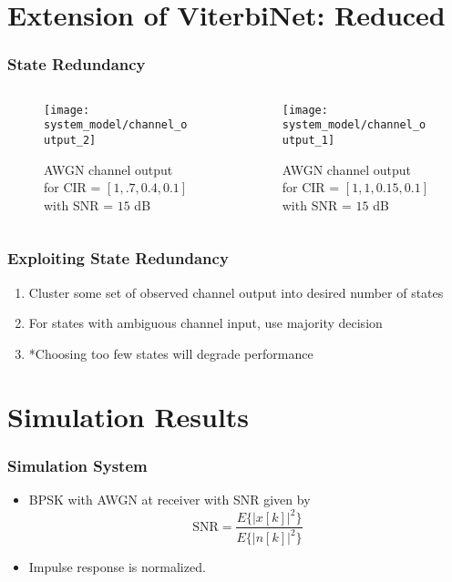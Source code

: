 \documentclass[10pt,tgadventor, onlymath]{beamer}
\begin{document}
\section{Extension of ViterbiNet: Reduced}
\begin{frame}
	\frametitle{State Redundancy}
\begin{columns}
\begin{column}{0.5\linewidth}
\centering
\begin{figure}
	\texttt{[image: system\_model/channel\_output\_2]}
	\caption{AWGN channel output for CIR = $[1, .7, 0.4, 0.1]$ with SNR = $15$ dB}
\end{figure}
\end{column}
\begin{column}{0.5\linewidth}
\centering
\begin{figure}
	\texttt{[image: system\_model/channel\_output\_1]}
	\caption{AWGN channel output for CIR =  $[1, 1, 0.15, 0.1]$ with SNR = $15$ dB}
\end{figure}
\end{column}
\end{columns}

\end{frame}

\begin{frame}
	\frametitle{Exploiting State Redundancy}
\begin{enumerate}
\item Cluster some set of observed channel output into desired number of states
\pause
\item For states with ambiguous channel input, use majority decision
\pause
\item *Choosing too few states will degrade performance
\end{enumerate}
\end{frame}


\section{Simulation Results}
\begin{frame}
\frametitle{Simulation System}
\begin{itemize}
\item BPSK with AWGN at receiver with SNR given by 
\begin{equation*}
\text{SNR} = \frac{E\{|x[k]|^2\}}{E\{|n[k]|^2\}}
\end{equation*}
\item 
Impulse response is normalized. 
\end{itemize}
\end{frame}
\end{document}
